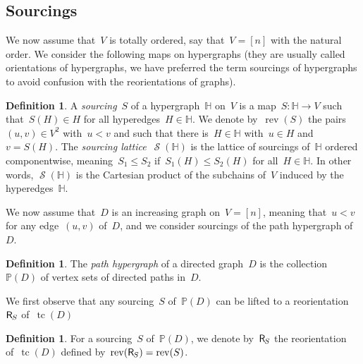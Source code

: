 \documentclass{amsart}
\theoremstyle{definition}
\newtheorem{definition}[theorem]{Definition}
\DeclareMathOperator{\tc}{tc} %
\newcommand{\darkblue}{\color{darkblue}} %
\newcommand{\defn}[1]{\textsl{\darkblue #1}} %
\newcommand{\vincent}[1]{\todo[size=\tiny,color=blue!30]{ #1 \\ \hfill --- V.}\,}
\newcommand{\mymap}[2]{\mathsf{#1}_{\hspace{-.7pt}#2}}
\newcommand{\reori}[1]{\mymap{R}{#1}}  %
\DeclareMathOperator{\rev}{rev} %
\DeclareMathOperator{\Sour}{\mathcal{S}}  %
\newcommand{\HH}{\mathbb H}  %
\newcommand{\II}{\mathbb I} %
\newcommand{\PP}{\mathbb P} %
\begin{document}
\subsection{Sourcings}
\label{subsec:sourcings}

We now assume that~$V$ is totally ordered, say that~$V = [n]$ with the natural order.
We consider the following maps on hypergraphs (they are usually called orientations of hypergraphs, we have preferred the term sourcings of hypergraphs to avoid confusion with the reorientations of graphs).

\begin{definition}
\label{def:Sour}
A \defn{sourcing}~$S$ of a hypergraph~$\HH$ on~$V$ is a map~$S : \HH \to V$ such that~$S(H) \in H$ for all hyperedges~$H \in \HH$.
We denote by~$\rev(S)$ the pairs~$(u,v) \in V^2$ with~$u < v$ and such that there is~$H \in \HH$ with~$u \in H$ and~$v = S(H)$.
The \defn{sourcing lattice}~$\Sour(\HH)$ is the lattice of sourcings of~$\HH$ ordered componentwise, meaning~$S_1 \le S_2$ if~$S_1(H) \le S_2(H)$ for all~$H \in \HH$.
In other words, $\Sour(\HH)$ is the Cartesian product of the subchains of~$V$ induced by the hyperedges~$\HH$.
\end{definition}

%

We now assume that~$D$ is an increasing graph on~$V = [n]$, meaning that~$u < v$ for any edge~$(u,v)$ of~$D$, and we consider sourcings of the path hypergraph of~$D$.

\begin{definition}
\label{def:pathHypergraph}
The \defn{path hypergraph} of a directed graph~$D$ is the collection~$\PP(D)$ of vertex sets of directed paths in~$D$.
\end{definition}

We first observe that any sourcing~$S$ of~$\PP(D)$ can be lifted to a reorientation~$\reori{S}$ of~$\tc(D)$

\begin{definition}
\label{def:Sour2Reori}
For a sourcing~$S$ of~$\PP(D)$, we denote by~$\reori{S}$ the reorientation of~$\tc(D)$ defined by~$\rev(\reori{S}) = \rev(S)$.
\end{definition}
\end{document}
